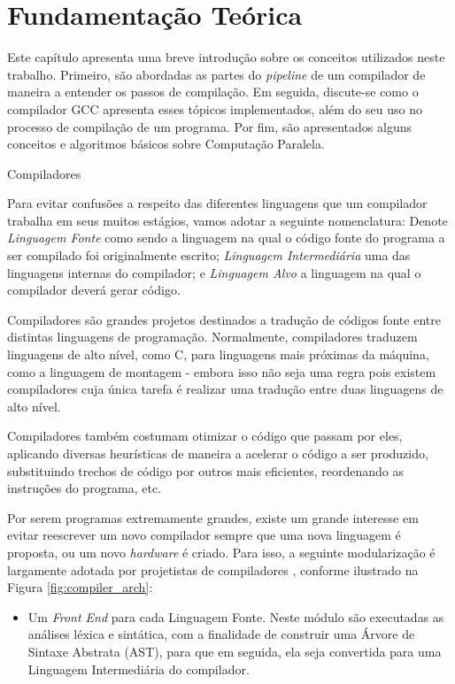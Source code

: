 \chapter{Fundamentação Teórica}
\label{chap:fundamentacao}

Este capítulo apresenta uma breve introdução sobre os conceitos utilizados neste
trabalho. Primeiro, são abordadas as partes do \textit{pipeline} de um compilador
de maneira a entender os passos de compilação.
Em seguida, discute-se como o compilador GCC apresenta esses tópicos implementados,
além do seu uso no processo de compilação de um programa. Por fim, são
apresentados alguns conceitos e algoritmos básicos sobre Computação Paralela.

\begin{section}{Compiladores}

Para evitar confusões a respeito das diferentes linguagens que um compilador
trabalha em seus muitos estágios, vamos adotar a seguinte nomenclatura:
Denote \textit{Linguagem Fonte} como sendo a linguagem
na qual o código fonte do programa a ser compilado foi originalmente escrito;
\textit{Linguagem Intermediária} uma das linguagens internas do compilador; e
\textit{Linguagem Alvo} a linguagem na qual o compilador deverá gerar código.

Compiladores são grandes projetos destinados a tradução de códigos fonte
entre distintas linguagens de programação. Normalmente, compiladores traduzem
linguagens de alto nível, como C, para linguagens mais próximas da máquina,
como a linguagem de montagem - embora isso não seja uma regra pois existem
compiladores cuja única tarefa é realizar uma tradução entre duas linguagens
de alto nível.

Compiladores também costumam otimizar
o código que passam por eles, aplicando diversas heurísticas de
maneira a acelerar o código a ser produzido, substituindo trechos de código por
outros mais eficientes, reordenando as instruções do programa, etc.

Por serem programas extremamente grandes, existe um grande interesse em evitar
reescrever um novo compilador
sempre que uma nova linguagem é proposta, ou um novo \textit{hardware} é criado.
Para isso, a seguinte modularização é largamente adotada por projetistas de
compiladores \citep{redhat} \citep{llvm}, conforme ilustrado na Figura \ref{fig:compiler_arch}:

\begin{itemize}
    \item Um \textit{Front End} para cada Linguagem Fonte.
	Neste módulo são executadas as análises léxica e sintática, com a
        finalidade de construir uma Árvore de Sintaxe Abstrata (AST), para que em
seguida, ela seja convertida para uma Linguagem Intermediária do compilador.


\end{itemize}
\end{section}
